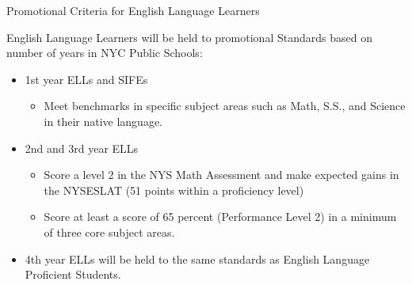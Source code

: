 \documentclass[12pt,letterpaper]{article}
\begin{document}
Promotional Criteria for English Language Learners

English Language Learners will be held to promotional Standards based on number of years in NYC Public
Schools:
\begin{itemize}
\item 1st year ELLs and SIFEs
	\begin{itemize}
	\item Meet benchmarks in specific subject areas such as Math, S.S., and Science in their native language.
	\end{itemize}
\item 2nd and 3rd year ELLs
\pagebreak
\vspace*{1.5cm}
	\begin{itemize}
	\item Score a level 2 in the NYS Math Assessment and make expected gains in the NYSESLAT (51 points within a proficiency level)
	\item Score at least a score of 65 percent (Performance Level 2) in a minimum of three core subject areas.
	\end{itemize}
\item 4th year ELLs will be held to the same standards as English Language Proficient Students.
\end{itemize}
\end{document}
